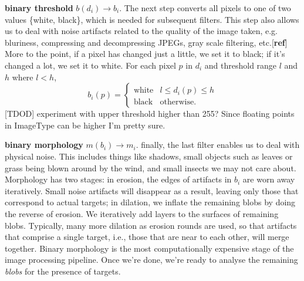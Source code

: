 \documentclass[letter]{article}
\begin{document}
 
 \textbf{binary threshold} $b(d_i) \rightarrow b_i$. The next step converts all pixels 
to one of two values \{white, black\}, which is needed for subsequent filters. 
This step also allows us to deal with noise artifacts related to the quality of the 
image taken, e.g. bluriness, compressing and decompressing JPEGs, gray scale 
filtering, etc.[\textbf{ref}] More to the point, if a pixel has changed just a little, we set it to 
black; if it's changed a lot, we set it to white. For each pixel $p$ in $d_i$ and 
threshold range $l$ and $h$ where $l < h$, 
\[
 b_i(p) = \left \{
  \begin{array}{ll}
    \textrm{white} & l \le d_i(p) \le h \\
    \textrm{black} & \textrm{otherwise.}
  \end{array} \right.
\] 
[TDOD] experiment with upper threshold higher than 255? Since floating points 
in ImageType can be higher I'm pretty sure. 


 \textbf{binary morphology} $m(b_i) \rightarrow m_i$. finally, the last filter 
enables us to deal with physical noise. This includes things like shadows,
small objects such as leaves or grass being blown around by the wind, and small
insects we may not care about. Morphology has two stages: in erosion, the edges of
artifacts in $b_i$ are worn away iteratively. Small noise artifacts will disappear 
as a result, leaving only those that correspond to actual targets; in dilation, we 
inflate the remaining blobs by doing the reverse of erosion. We iteratively add layers
to the surfaces of remaining blobs. 
Typically, many more dilation as erosion rounds are used, so that artifacts that 
comprise a single target, i.e., those that are near to each other, will merge together.
Binary morphology is the most computationally expensive stage of the image processing
pipeline. Once we're done, we're ready to analyse the remaining \textit{blobs} for 
the presence of targets. 
\end{document}
